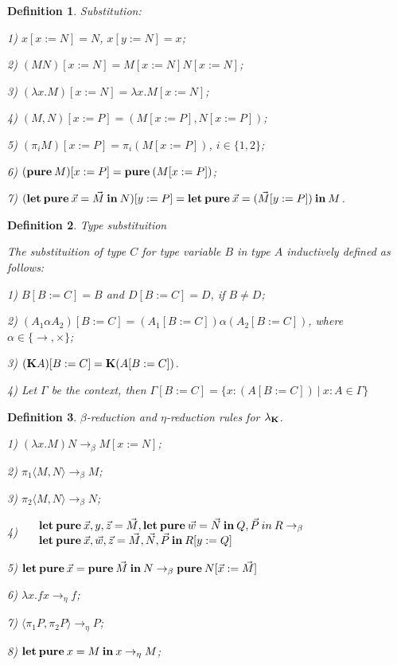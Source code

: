 \documentclass[a4paper]{article}
\newtheorem{defin}{Definition}
\begin{document}
  \begin{defin} Substitution:

  1) $x [x := N] = N$, $x [y := N] = x$;

  2) $(M N) [x := N] = M[x := N] N [x := N]$;

  3) $(\lambda x. M) [x := N] = \lambda x. M [x := N]$;

  4) $(M, N)[x := P] = (M[x := P], N [x := P])$;

  5) $(\pi_i M) [x := P] = \pi_i (M[x := P])$, $i \in \{ 1, 2\}$;

  6) $({\bf pure \: } M) [x := P] = {\bf pure \: } (M [x := P])$;

  7) $({\bf let \: pure \:}\vec{x} = \vec{M} {\: \bf in \:} N) [y := P] = {\bf let \: pure \:} \vec{x} = (\vec{M} [y := P]) {\: \bf in \:} M$.
  \end{defin}

  \begin{defin} Type substituition

    The substituition of type $C$ for type variable $B$ in type $A$ inductively defined as follows:

    1) $B [B := C] = B$ and $D [B := C] = D$, if $B \neq D$;

    2) $(A_1 \alpha A_2)[B := C] = (A_1[B := C]) \alpha (A_2[B := C])$, where $\alpha \in \{ \to, \times \}$;

    3) $({\bf K}A)[B := C] = {\bf K}(A [B := C])$.

    4) Let $\Gamma$ be the context, then $\Gamma [B := C] = \{ x : (A[B := C]) \: | \: x : A \in \Gamma \}$
  \end{defin}

  \begin{defin} $\beta$-reduction and $\eta$-reduction rules for $\lambda_{{\bf K}}$.

  1) $(\lambda x. M) N \rightarrow_{\beta} M [x := N]$;

  2) $\pi_1 \langle M, N \rangle \rightarrow_{\beta} M$;

  3) $\pi_2 \langle M, N \rangle \rightarrow_{\beta} N$;

  4) $\begin{array}{llll}
  & {\bf let \: pure \:} \vec{x}, y, \vec{z} = \vec{M}, {\bf let \: pure \: } \vec{w} = \vec{N} {\: \bf in \: } Q, \vec{P} {\: in \:} R \rightarrow_{\beta} & \\
  & {\bf let \: pure \:} \vec{x}, \vec{w}, \vec{z} = \vec{M}, \vec{N}, \vec{P} {\: \bf in \: } R [y := Q]
  \end{array}$

  5) ${\bf let \: pure \:} \vec{x} = {\bf pure \:} \vec{M} {\: \bf in \:} N \rightarrow_{\beta} {\bf pure \:} N [\vec{x} := \vec{M}]$

  6) $\lambda x. f x \rightarrow_{\eta} f$;

  7) $\langle \pi_1 P, \pi_2 P \rangle \rightarrow_{\eta} P$;

  8) ${\bf let \: pure \:} x = M {\: \bf in \: } x \rightarrow_{\eta} M$;
  \end{defin}
\end{document}
